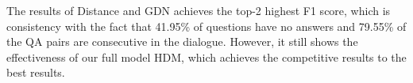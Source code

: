 The results of Distance and GDN achieves the top-2 highest F1 score, 
which is consistency with the fact that 41.95\% of questions have no answers 
and 79.55\% of the QA pairs are consecutive in the dialogue. 
However, it still shows the effectiveness of our full model HDM, 
which achieves the competitive results to the best results.



